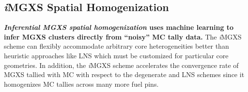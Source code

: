 \documentclass[12pt,twoside]{mitthesis-exec}
\begin{document}




\subsection*{\textit{i}MGXS Spatial Homogenization}

\textbf{\textit{Inferential MGXS spatial homogenization} uses machine learning to infer MGXS clusters directly from ``noisy'' MC tally data.} The \textit{i}MGXS scheme can flexibly accommodate arbitrary core heterogeneities better than heuristic approaches like LNS which must be customized for particular core geometries. In addition, the \textit{i}MGXS scheme accelerates the convergence rate of MGXS tallied with MC with respect to the degenerate and LNS schemes since it homogenizes MC tallies across many more fuel pins.

\end{document}
